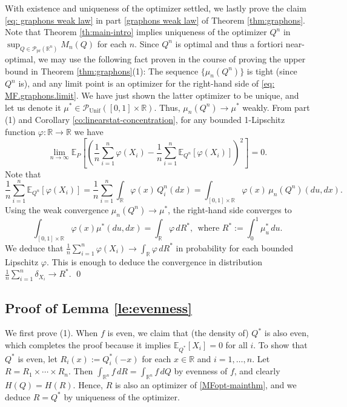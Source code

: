 \documentclass[11pt,reqno]{amsart}
\numberwithin{equation}{section}
\theoremstyle{definition}
\def\E{{\mathbb E}}
\def\R{{\mathbb R}}
\def\P{{\mathcal P}}
\def\Pprod{\P_{\mathrm{pr}}}
\def\Punif{\P_{\mathrm{Unif}}([0,1] \times \R)}
\begin{document}
With existence and uniqueness of the optimizer settled, we lastly prove the claim \eqref{eq: graphons weak law} in part \eqref{graphons weak law} of Theorem \ref{thm:graphons}.
Note that Theorem \ref{th:main-intro} implies uniqueness of the optimizer $Q^n$ in $\sup_{Q \in \Pprod(\R^n)}M_n(Q)$ for each $n$. 
Since $Q^n$ is optimal and thus a fortiori near-optimal, we may use the following fact proven in the course of proving the upper bound in Theorem \ref{thm:graphons}(1): The sequence $\{\mu_n(Q^n)\}$ is tight (since $Q^n$ is), and any limit point  is an optimizer for the right-hand side of \eqref{eq: MF.graphons.limit}. We have just shown the latter optimizer to be unique, and let us denote it $\mu^* \in \Punif$. Thus, $\mu_n(Q^n) \to \mu^*$ weakly.
From part (1) and Corollary \ref{co:linearstat-concentration}, for any bounded 1-Lipschitz function $\varphi : \R \to \R$   we have
\begin{equation*}
	\lim_{n \to \infty}\E_P\left[ \left(\frac{1}{n}\sum_{i=1}^n\varphi(X_i) - \frac{1}{n}\sum_{i=1}^n\E_{Q^n}[\varphi(X_i)]\right)^2\right] = 0.
\end{equation*}
Note that
\begin{equation*}
	\frac{1}{n}\sum_{i=1}^n\E_{Q^n}[\varphi(X_i)] = \frac{1}{n} \sum_{i=1}^n \int_{\R} \varphi(x) \,Q^n_i(dx) = \int_{[0,1] \times \R} \varphi(x) \,\mu_n(Q^n)(du, dx).
\end{equation*}
Using the weak convergence $\mu_n(Q^n) \to \mu^*$, the right-hand side converges to
\begin{equation*}
	\int_{[0,1] \times \R} \varphi(x) \mu^* (du, dx) = \int_\R \varphi \,dR^*, \ \ \text{where } R^* := \int_0^1 \mu^*_u\,du.
\end{equation*}
We deduce that $ \frac{1}{n} \sum_{i=1}^n \varphi(X_i) \to  \int_{\R} \varphi \,dR^*$ in probability for each bounded Lipschitz $\varphi$. This is enough to deduce the convergence in distribution $ \frac{1}{n} \sum_{i=1}^n \delta_{X_i} \to R^*$. \hfill \qed


\subsection{Proof of Lemma \ref{le:evenness}}
We first prove (1). When $f$ is even, we claim that (the density of) $Q^*$ is also even, which completes the proof because it implies $\E_{Q^*}[X_i]=0$ for all $i$.  To show that $Q^*$ is even, let $R_i(x):=Q^*_i(-x)$ for each $x \in \R$ and $i=1,\ldots,n$. Let $R=R_1\times \cdots \times R_n$. Then $\int_{\R^n} f\,dR=\int_{\R^n} f\,dQ$ by evenness of $f$, and clearly $H(Q)=H(R)$. Hence, $R$ is also an optimizer of \eqref{MFopt-mainthm}, and we deduce $R=Q^*$ by uniqueness of the optimizer.
\end{document}
